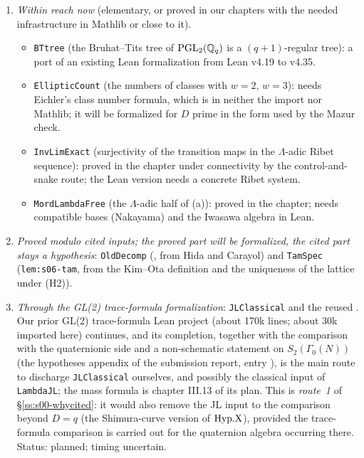 \begin{enumerate}[label=(\Alph*)]
\item \emph{Within reach now} (elementary, or proved in our chapters with the needed infrastructure in Mathlib or close to it).
  \begin{itemize}  \item \texttt{BTtree} (the Bruhat--Tits tree of $\mathrm{PGL}_2(\mathbb{Q}_q)$ is a $(q+1)$-regular tree): a port of an existing Lean
    formalization from Lean v4.19 to v4.35.
  \item \texttt{EllipticCount} (the numbers of classes with $w=2$, $w=3$): needs Eichler's class number formula, which is in
    neither the import nor Mathlib; it will be formalized for $D$ prime in the form used by the Mazur check.
  \item \texttt{InvLimExact} (surjectivity of the transition maps in the $\Lambda$-adic Ribet sequence): proved in the chapter
    under connectivity by the control-and-snake route; the Lean version needs a concrete Ribet system.
  \item \texttt{MordLambdaFree} (the $\Lambda$-adic half of (a)): proved in the chapter; needs
    compatible bases (Nakayama) and the Iwasawa algebra in Lean.
  \end{itemize}
\item \emph{Proved modulo cited inputs; the proved part will be formalized, the cited part stays a hypothesis}:
  \texttt{OldDecomp} (, from Hida and Carayol) and \texttt{TamSpec} (\texttt{lem:s06-tam}, from the
  Kim--Ota definition and the uniqueness of the lattice under (H2)).
\item \emph{Through the GL(2) trace-formula formalization}: \texttt{JLClassical} and the reused .
  Our prior GL(2) trace-formula Lean project (about 170k lines; about 30k imported here) continues, and its completion, together with the comparison with the quaternionic side and a non-schematic statement on $S_2(\Gamma_0(N))$ (the hypotheses appendix of the submission report, entry ), is the
  main route to discharge \texttt{JLClassical} ourselves, and possibly the classical input of \texttt{LambdaJL}; the mass
  formula is chapter III.13 of its plan. This is \emph{route~1} of \S\ref{ss:s00-whycited}: it would also remove the JL input to
  the comparison beyond $D=q$ (the Shimura-curve version of $\mathrm{Hyp.X}$), provided the trace-formula comparison is carried out for the quaternion algebra occurring there. Status: planned; timing uncertain.

\end{enumerate}
